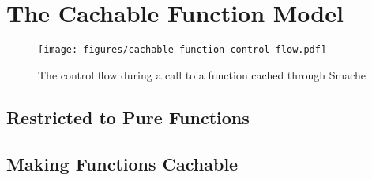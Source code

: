 
\section{The Cachable Function Model}
\label{sec:the_cachable_function_model}


\begin{figure*}[ht!]
  \centering
  \texttt{[image: figures/cachable-function-control-flow.pdf]}
  \caption{The control flow during a call to a function cached through Smache}
  \label{fig:cachable-function-control-flow}
\end{figure*}




\subsection{Restricted to Pure Functions}
\label{subsec:restricted_to_pure_functions}



\subsection{Making Functions Cachable}
\label{subsec:making_functions_cachable}



